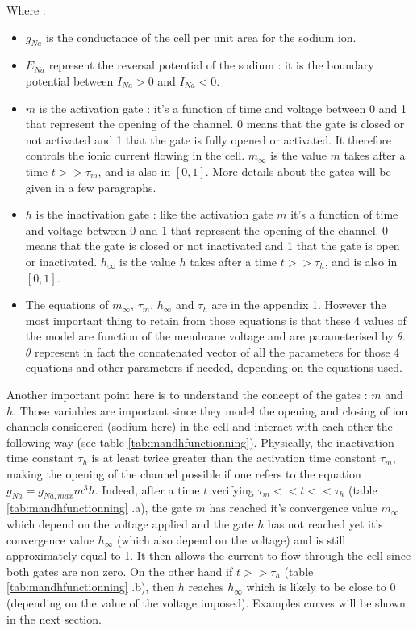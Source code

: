 \documentclass[11pt]{report}
\begin{document}
\newpage

Where :
\begin{itemize}
    \item $g_{Na}$ is the conductance of the cell per unit area for the sodium ion.
    
    \item $E_{Na} $ represent the reversal potential of the sodium : it is the boundary potential between $I_{Na} >0$ and $I_{Na} <0$.
    
    \item $m$ is the activation gate : it's a function of time and voltage between 0 and 1 that represent the opening of the channel. 0 means that the gate is closed or not activated and 1 that the gate is fully opened or activated. It therefore controls the ionic current flowing in the cell. $m_{\infty}$ is the value $m$ takes after a time $t>>\tau_{m}$, and is also in $[0,1]$. More details about the gates will be given in a few paragraphs.
    
    \item $h$ is the inactivation gate : like the activation gate $m$ it's a function of time and voltage between 0 and 1 that represent the opening of the channel. 0 means that the gate is closed or not inactivated and 1 that the gate is open or inactivated. $h_{\infty}$ is the value $h$ takes after a time $t>>\tau_{h}$, and is also in $[0,1]$.
    
    \item The equations of $m_{\infty}$, $\tau_{m}$, $h_{\infty}$ and $\tau_{h}$ are in the appendix 1. However the most important thing to retain from those equations is that these 4 values of the model are function of the membrane voltage and are parameterised by $\theta$. $\theta$ represent in fact the concatenated vector of all the parameters for those 4 equations and other parameters if needed, depending on the equations used.
\end{itemize}
Another important point here is to understand the concept of the gates : $m$ and $h$. Those variables are important since they model the opening and closing of ion channels considered (sodium here) in the cell and interact with each other the following way (see table \ref{tab:mandhfunctionning}). Physically, the inactivation time constant $\tau_{h}$ is at least twice greater than the activation time constant $\tau_{m}$, making the opening of the channel possible if one refers to the equation $g_{Na} = g_{Na,max}m^{3}h $. Indeed, after a time $t$ verifying $ \tau_{m} << t << \tau_{h}$ (table \ref{tab:mandhfunctionning} .a), the gate $m$ has reached it's convergence value $m_{\infty}$ which depend on the voltage applied and the gate $h$ has not reached yet it's convergence value $h_{\infty}$ (which also depend on the voltage) and is still approximately equal to 1. It then allows the current to flow through the cell since both gates are non zero. On the other hand if $t >> \tau_{h}$ (table \ref{tab:mandhfunctionning} .b), then $h$ reaches $h_{\infty}$ which is likely to be close to 0 (depending on the value of the voltage imposed). Examples curves will be shown in the next section.
\end{document}

